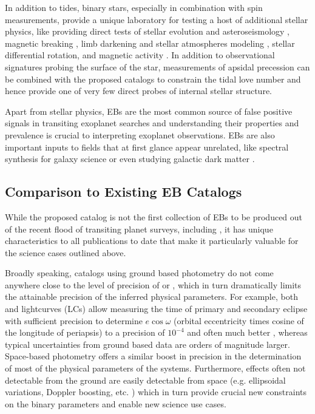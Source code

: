 In addition to tides, binary stars, especially in combination with spin
measurements, provide a unique laboratory for testing a host of additional
stellar physics, like providing direct tests of stellar evolution and
asteroseismology \citep[e.g.][]{Gaulme_et_al_16, delBurgo_AllendePrieto_18,
Garrido_et_al_19, Cruz_et_al_22}, magnetic breaking
\citep[e.g.][]{ElBadry_et_al_22}, limb darkening and stellar atmospheres
modeling \citep[e.g.][]{Southworth_et_al_07, Zola_et_al_15, Matson_et_al_16},
stellar differential rotation, and magnetic activity
\citep[e.g.][]{Reinhold_et_al_13, Jermyn_et_al_20a, Jermyn_et_al_20b}.  In
addition to observational signatures probing the surface of the star,
measurements of apsidal precession can be combined with the proposed catalogs to
constrain the tidal love number and hence provide one of very few direct probes
of internal stellar structure.

Apart from stellar physics, EBs are the most common source of false positive
signals in transiting exoplanet searches and understanding their properties and
prevalence is crucial to interpreting exoplanet observations. EBs are also
important inputs to fields that at first glance appear unrelated, like spectral
synthesis for galaxy science \citep[e.g.][]{Eldridge_et_al_17} or even studying
galactic dark matter \citep[e.g.][]{Chakrabarti_22}.

\subsection{Comparison to Existing EB Catalogs}
%
\label{sec:comparison_to_existing}
%
While the proposed catalog is not the first collection of EBs to be produced out
of the recent flood of transiting planet surveys, including \tess{}, it has
unique characteristics to all publications to date that make it particularly
valuable for the science cases outlined above.

Broadly speaking, catalogs using ground based photometry do not come anywhere
close to the level of precision of \tess{} or \kepler{}, which in turn
dramatically limits the attainable precision of the inferred physical
parameters. For example, both \tess{} and \kepler{} lightcurves (LCs) allow
measuring the time of primary and secondary eclipse with sufficient precision to
determine $e\cos\omega$ (orbital eccentricity times cosine of the longitude of
periapsis) to a precision of $10^{-4}$ and often much better
\citep{Windemuth_et_al_19, Justesen_Albrecht_21}, whereas typical uncertainties
from ground based data are orders of magnitude larger. Space-based photometry
offers a similar boost in precision in the determination of most of the physical
parameters of the systems.  Furthermore, effects often not detectable from the
ground are easily detectable from space (e.g. ellipsoidal variations, Doppler
boosting, etc. \citep{Engel_et_al_20, Green_et_al_23}) which in turn provide
crucial new constraints on the binary parameters and enable new science use
cases.


